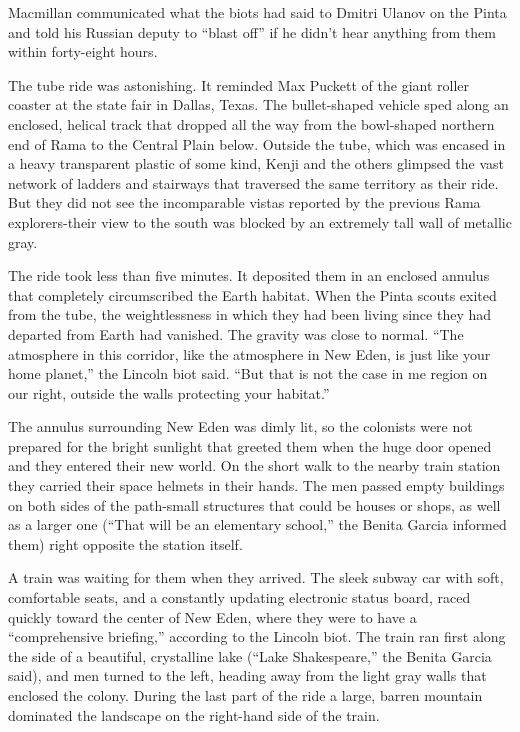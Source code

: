\documentclass[]{article}
\begin{document}
{Macmillan communicated what the biots had said to Dmitri Ulanov on the Pinta and told his Russian deputy to “blast off” if he didn’t hear anything from them within forty-eight hours.

The tube ride was astonishing. It reminded Max Puckett of the giant roller coaster at the state fair in Dallas, Texas. The bullet-shaped vehicle sped along an enclosed, helical track that dropped all the way from the bowl-shaped northern end of Rama to the Central Plain below. Outside the tube, which was encased in a heavy transparent plastic of some kind, Kenji and the others glimpsed the vast network of ladders and stairways that traversed the same territory as their ride. But they did not see the incomparable vistas reported by the previous Rama explorers-their view to the south was blocked by an extremely tall wall of metallic gray.

The ride took less than five minutes. It deposited them in an enclosed annulus that completely circumscribed the Earth habitat. When the Pinta scouts exited from the tube, the weightlessness in which they had been living since they had departed from Earth had vanished. The gravity was close to normal. “The atmosphere in this corridor, like the atmosphere in New Eden, is just like your home planet,” the Lincoln biot said. “But that is not the case in me region on our right, outside the walls protecting your habitat.”

The annulus surrounding New Eden was dimly lit, so the colonists were not prepared for the bright sunlight that greeted them when the huge door opened and they entered their new world. On the short walk to the nearby train station they carried their space helmets in their hands. The men passed empty buildings on both sides of the path-small structures that could be houses or shops, as well as a larger one (“That will be an elementary school,” the Benita Garcia informed them) right opposite the station itself.

A train was waiting for them when they arrived. The sleek subway car with soft, comfortable seats, and a constantly updating electronic status board, raced quickly toward the center of New Eden, where they were to have a “comprehensive briefing,” according to the Lincoln biot. The train ran first along the side of a beautiful, crystalline lake (“Lake Shakespeare,” the Benita Garcia said), and men turned to the left, heading away from the light gray walls that enclosed the colony. During the last part of the ride a large, barren mountain dominated the landscape on the right-hand side of the train.

}
\end{document}
